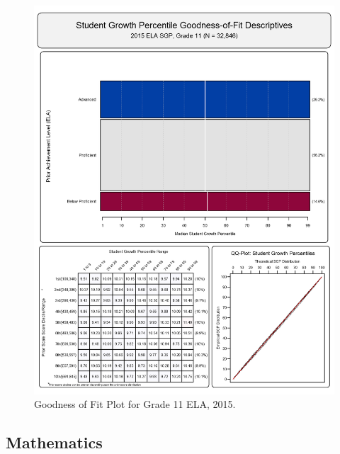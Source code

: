 \documentclass[12pt]{article}
\begin{document}
\begin{figure}[htbp]
\centering
\includegraphics{../img/Goodness_of_Fit/ELA.2015/2015_ELA_11;2014_ELA_10;2013_ELA_9;2012_ELA_8;2011_ELA_7;2010_ELA_6.png}
\caption{Goodness of Fit Plot for Grade 11 ELA, 2015.}
\end{figure}

\clearpage 

\subsection{Mathematics}\label{mathematics}
\end{document}
